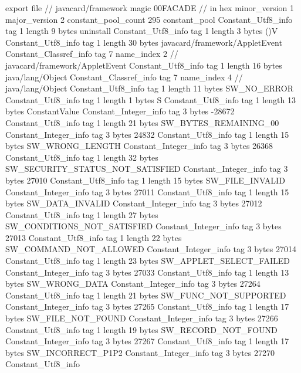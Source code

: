 export file {		// javacard/framework
	magic	00FACADE		 // in hex
	minor_version	1
	major_version	2
	constant_pool_count	295
	constant_pool {
		Constant_Utf8_info {
			tag	1
			length	9
			bytes	uninstall
		}
		Constant_Utf8_info {
			tag	1
			length	3
			bytes	()V
		}
		Constant_Utf8_info {
			tag	1
			length	30
			bytes	javacard/framework/AppletEvent
		}
		Constant_Classref_info {
			tag	7
			name_index	2		// javacard/framework/AppletEvent
		}
		Constant_Utf8_info {
			tag	1
			length	16
			bytes	java/lang/Object
		}
		Constant_Classref_info {
			tag	7
			name_index	4		// java/lang/Object
		}
		Constant_Utf8_info {
			tag	1
			length	11
			bytes	SW_NO_ERROR
		}
		Constant_Utf8_info {
			tag	1
			length	1
			bytes	S
		}
		Constant_Utf8_info {
			tag	1
			length	13
			bytes	ConstantValue
		}
		Constant_Integer_info {
			tag	3
			bytes	-28672
		}
		Constant_Utf8_info {
			tag	1
			length	21
			bytes	SW_BYTES_REMAINING_00
		}
		Constant_Integer_info {
			tag	3
			bytes	24832
		}
		Constant_Utf8_info {
			tag	1
			length	15
			bytes	SW_WRONG_LENGTH
		}
		Constant_Integer_info {
			tag	3
			bytes	26368
		}
		Constant_Utf8_info {
			tag	1
			length	32
			bytes	SW_SECURITY_STATUS_NOT_SATISFIED
		}
		Constant_Integer_info {
			tag	3
			bytes	27010
		}
		Constant_Utf8_info {
			tag	1
			length	15
			bytes	SW_FILE_INVALID
		}
		Constant_Integer_info {
			tag	3
			bytes	27011
		}
		Constant_Utf8_info {
			tag	1
			length	15
			bytes	SW_DATA_INVALID
		}
		Constant_Integer_info {
			tag	3
			bytes	27012
		}
		Constant_Utf8_info {
			tag	1
			length	27
			bytes	SW_CONDITIONS_NOT_SATISFIED
		}
		Constant_Integer_info {
			tag	3
			bytes	27013
		}
		Constant_Utf8_info {
			tag	1
			length	22
			bytes	SW_COMMAND_NOT_ALLOWED
		}
		Constant_Integer_info {
			tag	3
			bytes	27014
		}
		Constant_Utf8_info {
			tag	1
			length	23
			bytes	SW_APPLET_SELECT_FAILED
		}
		Constant_Integer_info {
			tag	3
			bytes	27033
		}
		Constant_Utf8_info {
			tag	1
			length	13
			bytes	SW_WRONG_DATA
		}
		Constant_Integer_info {
			tag	3
			bytes	27264
		}
		Constant_Utf8_info {
			tag	1
			length	21
			bytes	SW_FUNC_NOT_SUPPORTED
		}
		Constant_Integer_info {
			tag	3
			bytes	27265
		}
		Constant_Utf8_info {
			tag	1
			length	17
			bytes	SW_FILE_NOT_FOUND
		}
		Constant_Integer_info {
			tag	3
			bytes	27266
		}
		Constant_Utf8_info {
			tag	1
			length	19
			bytes	SW_RECORD_NOT_FOUND
		}
		Constant_Integer_info {
			tag	3
			bytes	27267
		}
		Constant_Utf8_info {
			tag	1
			length	17
			bytes	SW_INCORRECT_P1P2
		}
		Constant_Integer_info {
			tag	3
			bytes	27270
		}
		Constant_Utf8_info {
}}}
